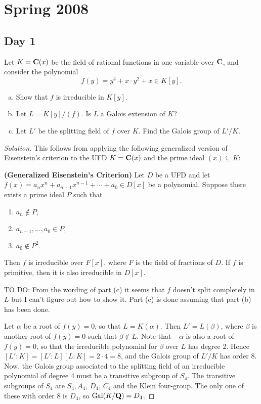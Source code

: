 \section{Spring 2008}
\label{S:spring-2008}

\subsection{Day 1}
\label{S:spring-2008-1}
\mbox{}


Let $K = \mathbf{C}(x)$ be the field of rational functions in one variable over $\mathbf{C}$, and consider the polynomial
	\[
	f(y) = y^4 + x \cdot y^2 + x \in K[y].
	\]
\begin{enumerate}[(a)]
\item Show that $f$ is irreducible in $K[y]$.
\item Let $L = K[y]/(f)$. Is $L$ a Galois extension of $K$?
\item Let $L'$ be the splitting field of $f$ over $K$.  Find the Galois group of $L'/K$.
\end{enumerate}

\begin{proof}[Solution]
   This follows from applying the following generalized version of Eisenstein's criterion to the UFD $K = \mathbf{C}(x)$ and the prime ideal $(x) \subseteq K$:
  
  \textbf{(Generalized Eisenstein's Criterion)} Let $D$ be a UFD and let $f(x) = a_nx^n + a_{n-1}x^{n-1} + \cdots + a_0 \in D[x]$ be a polynomial.  Suppose there exists a prime ideal $P$ such that
  \begin{enumerate}
  \item $a_n \not \in P$,
  \item $a_{n-1}, \ldots, a_0 \in P$,
  \item $a_0 \not \in P^2$.
  \end{enumerate}
  Then $f$ is irreducible over $F[x]$, where $F$ is the field of fractions of $D$.  If $f$ is primitive, then it is also irreducible in $D[x]$.
  
  TO DO: From the wording of part (c) it seems that $f$ doesn't split completely in $L$ but I can't figure out how to show it.  Part (c) is done assuming that part (b) has been done.
  
  Let $\alpha$ be a root of $f(y) = 0$, so that $L = K(\alpha)$.  Then $L' = L(\beta)$, where $\beta$ is another root of $f(y) = 0$ such that $\beta \not \in L$.  Note that $-\alpha$ is also a root of $f(y) = 0$, so that the irreducible polynomial for $\beta$ over $L$ has degree 2.  Hence $[L' : K] = [L' : L][L : K] = 2 \cdot 4 = 8$, and the Galois group of $L'/K$ has order 8.  Now, the Galois group associated to the splitting field of an irreducible polynomial of degree 4 must be a transitive subgroup of $S_4$.  The transitive subgroups of $S_4$ are $S_4, A_4$, $D_4$, $C_4$ and the Klein four-group.  The only one of these with order $8$ is $D_4$, so $\mathrm{Gal}(K/\mathbf{Q}) = D_4$.
\end{proof}

